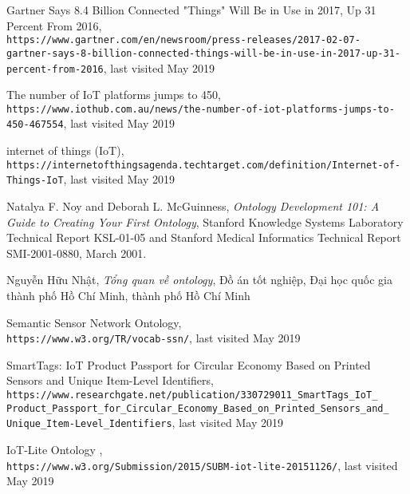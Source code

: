 \renewcommand{\bibname}{Tài liệu tham khảo}


\begin{thebibliography}{10}

Gartner Says 8.4 Billion Connected "Things" Will Be in Use in 2017, Up 31 Percent From 2016,
\\\texttt{https://www.gartner.com/en/newsroom/press-releases/2017-02-07-\\gartner-says-8-billion-connected-things-will-be-in-use-in-2017-up-31-\\percent-from-2016}, last visited May 2019

 The number of IoT platforms jumps to 450,
\\\texttt{https://www.iothub.com.au/news/the-number-of-iot-platforms-jumps-to-\\450-467554}, last visited May 2019

 internet of things (IoT),
\\\texttt{https://internetofthingsagenda.techtarget.com/definition/Internet-of-\\Things-IoT}, last visited May 2019

 Natalya F. Noy and Deborah L. McGuinness,
\textit{Ontology Development 101: A Guide to Creating Your First Ontology},
Stanford Knowledge Systems Laboratory Technical Report KSL-01-05 and Stanford Medical Informatics Technical Report SMI-2001-0880, March 2001. 

 Nguyễn Hữu Nhật,
\textit{Tổng quan về ontology},
Đồ án tốt nghiệp, Đại học quốc gia thành phố Hồ Chí Minh, thành phố Hồ Chí Minh

 Semantic Sensor Network Ontology,
\\\texttt{https://www.w3.org/TR/vocab-ssn/}, last visited May 2019


 SmartTags: IoT Product Passport for Circular Economy Based on Printed Sensors and Unique Item-Level Identifiers,
\\\texttt{https://www.researchgate.net/publication/330729011\_SmartTags\_IoT\_\\Product\_Passport\_for\_Circular\_Economy\_Based\_on\_Printed\_Sensors\_and\_\\Unique\_Item-Level\_Identifiers}, last visited May 2019

  IoT-Lite Ontology ,
\\\texttt{https://www.w3.org/Submission/2015/SUBM-iot-lite-20151126/}, last visited May 2019

\end{thebibliography}

